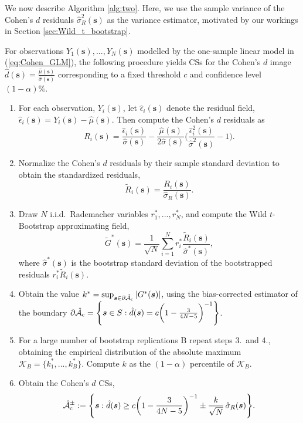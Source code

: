 We now describe Algorithm \ref{alg:two}. Here, we use the sample variance of the Cohen's $d$ residuals $\hat{\sigma}_{R}^{2}(\bm{s})$ as the variance estimator, motivated by our workings in Section \ref{sec:Wild_t_bootstrap}.

\begin{algorithm}
\label{alg:two}
For observations $Y_{1}(\bm{s}), ..., Y_{N}(\bm{s})$ modelled by the one-sample linear model in (\ref{eq:Cohen_GLM}), the following procedure yields CSs for the Cohen's $d$ image $\hat{d}(\bm{s}) = \frac{\hat{\mu}(\bm{s})}{\hat{\sigma}(\bm{s})}$ corresponding to a fixed threshold $c$ and confidence level $(1 - \alpha)\%$.
\begin{enumerate}
\item For each observation, $Y_i(\bm{s})$, let $\hat{\epsilon}_{i}(\bm{s})$ denote the residual field, $\hat{\epsilon}_{i}(\bm{s}) = Y_{i}(\bm{s}) - \hat{\mu}(\bm{s})$. Then compute the Cohen's $d$ residuals as 
$$R_{i}(\bm{s}) = \frac{\hat{\epsilon}_{i}(\bm{s})}{\hat{\sigma}(\bm{s})} - \frac{\hat{\mu}(\bm{s})}{2\hat{\sigma}(\bm{s})}\Bigg( \frac{\hat{\epsilon}_{i}^{2}(\bm{s})}{\hat{\sigma}^{2}(\bm{s})} - 1 \Bigg).$$ 
\item Normalize the Cohen's $d$ residuals by their sample standard deviation to obtain the standardized residuals,
$$\tilde{R}_{i}(\bm{s}) = \frac{R_{i}(\bm{s})}{\hat{\sigma}_{R}(\bm{s})}.$$ 
\item Draw $N$ i.i.d.\ Rademacher variables $r_{1}^{*}, ..., r_{N}^{*}$, and compute the Wild $t$-Bootstrap approximating field,
$$\tilde{G}^{*}(\bm{s}) = \frac{1}{\sqrt{N}}\sum_{i=1}^{N} r^*_i\frac{\tilde{R}_{i}(\bm{s})}{\hat{\sigma}^*(\bm{s})},$$
where $\hat{\sigma}^{*}(\bm{s})$ is the bootstrap standard deviation of the bootstrapped residuals $r_{i}^{*}\tilde{R}_{i}(\bm{s})$. 
\item Obtain the value $k^{*} = \sup_{\bm{s}\in\operatorname{\partial\hat{\mathcal{A}}_{c}}}|G^{*}(\bm{s})|$, using the bias-corrected estimator of the boundary $\operatorname{\partial\hat{\mathcal{A}}_{c}} = \Bigg\{\bm{s} \in S : \hat{d}(\bm{s}) = c\bigg(1 - \frac{3}{4N - 5}\bigg)^{-1} \Bigg\}$.
\item For a large number of bootstrap replications B repeat steps 3.\ and 4., obtaining the empirical distribution of the absolute maximum $\mathcal{K}_{B} = \{k_{1}^{*}, ..., k_{B}^{*}\}$. Compute $k$ as the $(1 - \alpha)$ percentile of $\mathcal{K}_{B}$.
\item Obtain the Cohen's $d$ CSs,
$$\operatorname{\hat{\mathcal{A}}_{c}^\pm} := \Bigg\{\bm{s} : \hat{d}(\bm{s}) \geq c\bigg(1 - \frac{3}{4N - 5}\bigg)^{-1} \pm \frac{k}{\sqrt{N}}\, \hat{\sigma}_{R}(\bm{s}) \Bigg\}.$$
\end{enumerate}
\end{algorithm}


